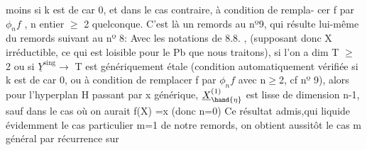  moins si k est de car 0, et dans le cas contraire, à condition de rempla-%
cer f par $\phi_{n}f$ , n entier $\geq$ 2 quelconque.  C'est là  un remords au nº9,
qui résulte lui-même du remords suivant au nº 8:  Avec les notations de
8.8. , (supposant donc X irréductible, ce qui est loisible pour le Pb
que nous traitons), si  l'on a dim T $\geq$ 2  ou si  $\underline{Y}^{\text{sing}}\rightarrow$ T  est
génériquement étale (condition automatiquement vérifiée si k est de car 0,
ou à condition de remplacer f par $\phi_{n}f$ avec n$\geq$2, cf nº 9), alors pour
l'hyperplan  H\hand{$_{\eta}$} passant par x  générique,  $\underline{X}^{(1)}_{\hand{\eta}}$ est lisse
de dimension n-1,  sauf dans le cas  où  on aurait  f(X) =\hand{$\{$}x\hand{$\}$}  (donc n=0)
Ce résultat admis,\hand{(}qui liquide évidemment le cas particulier m=1 de
notre remords, on obtient aussitôt le cas  m général  par récurrence sur

